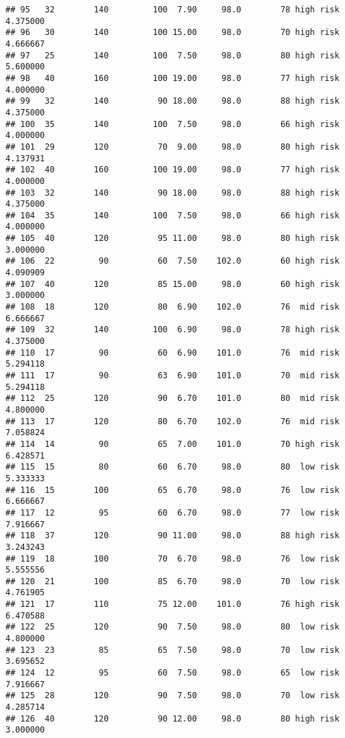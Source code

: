 \documentclass[
  ignorenonframetext,
]{beamer}
\begin{document}
\begin{frame}[fragile]
\begin{verbatim}
## 95   32        140         100  7.90     98.0        78 high risk      4.375000
## 96   30        140         100 15.00     98.0        70 high risk      4.666667
## 97   25        140         100  7.50     98.0        80 high risk      5.600000
## 98   40        160         100 19.00     98.0        77 high risk      4.000000
## 99   32        140          90 18.00     98.0        88 high risk      4.375000
## 100  35        140         100  7.50     98.0        66 high risk      4.000000
## 101  29        120          70  9.00     98.0        80 high risk      4.137931
## 102  40        160         100 19.00     98.0        77 high risk      4.000000
## 103  32        140          90 18.00     98.0        88 high risk      4.375000
## 104  35        140         100  7.50     98.0        66 high risk      4.000000
## 105  40        120          95 11.00     98.0        80 high risk      3.000000
## 106  22         90          60  7.50    102.0        60 high risk      4.090909
## 107  40        120          85 15.00     98.0        60 high risk      3.000000
## 108  18        120          80  6.90    102.0        76  mid risk      6.666667
## 109  32        140         100  6.90     98.0        78 high risk      4.375000
## 110  17         90          60  6.90    101.0        76  mid risk      5.294118
## 111  17         90          63  6.90    101.0        70  mid risk      5.294118
## 112  25        120          90  6.70    101.0        80  mid risk      4.800000
## 113  17        120          80  6.70    102.0        76  mid risk      7.058824
## 114  14         90          65  7.00    101.0        70 high risk      6.428571
## 115  15         80          60  6.70     98.0        80  low risk      5.333333
## 116  15        100          65  6.70     98.0        76  low risk      6.666667
## 117  12         95          60  6.70     98.0        77  low risk      7.916667
## 118  37        120          90 11.00     98.0        88 high risk      3.243243
## 119  18        100          70  6.70     98.0        76  low risk      5.555556
## 120  21        100          85  6.70     98.0        70  low risk      4.761905
## 121  17        110          75 12.00    101.0        76 high risk      6.470588
## 122  25        120          90  7.50     98.0        80  low risk      4.800000
## 123  23         85          65  7.50     98.0        70  low risk      3.695652
## 124  12         95          60  7.50     98.0        65  low risk      7.916667
## 125  28        120          90  7.50     98.0        70  low risk      4.285714
## 126  40        120          90 12.00     98.0        80 high risk      3.000000

\end{verbatim}
\end{frame}
\end{document}
